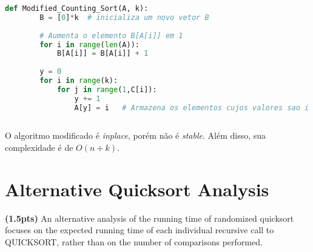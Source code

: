 \documentclass{article}
\begin{document}
\begin{enumerate}[label=(\alph*)]
  \vspace{\baselineskip}
  
  \begin{lstlisting}[language=Python]
    def Modified_Counting_Sort(A, k):
        B = [0]*k  # inicializa um novo vetor B
        
        # Aumenta o elemento B[A[i]] em 1
        for i in range(len(A)):
            B[A[i]] = B[A[i]] + 1
        
        y = 0
        for i in range(k):
            for j in range(1,C[i]):
                y += 1
                A[y] = i   # Armazena os elementos cujos valores sao i
    
\end{lstlisting}

O algoritmo modificado é \textit{inplace}, porém não é \textit{stable}. Além disso, sua complexidade é de $O(n+k)$.

\end{enumerate}



\vspace{\baselineskip}

\section{Alternative Quicksort Analysis} 
\textbf{(1.5pts)} An alternative analysis of the running time of randomized quicksort focuses on the expected running time of each individual recursive call to QUICKSORT, rather than on the number of comparisons performed.
\end{document}
